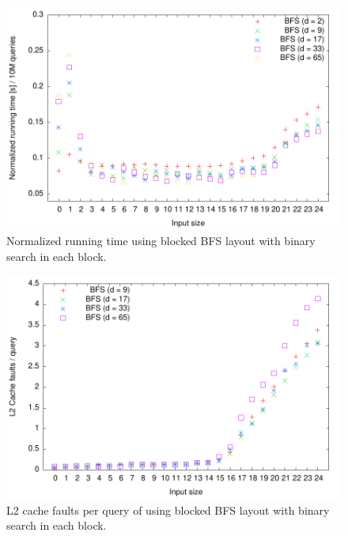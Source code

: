 \begin{figure}[h!]
  \centering
  \includegraphics[width=\textwidth]{../week1/plots/outputs/Btree_bs_runningtime}
  \caption{Normalized running time using blocked BFS layout with binary search in each block.}
  \label{fig:blocked_bfs_bs_runningtime}
\end{figure}

\begin{figure}[h!]

  \centering
  \includegraphics[width=\textwidth]{../week1/plots/outputs/Btree_bs_cachefaults}
  \caption{L2 cache faults per query of using blocked BFS layout with binary search in each block.}
  \label{fig:blocked_bfs_bs_cachefaults}
\end{figure}

